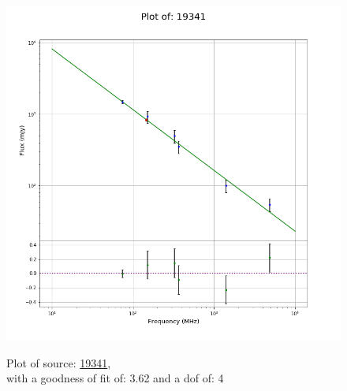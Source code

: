 \documentclass{article}
\begin{document}
\begin{figure}[H]
    \centering
    \begin{minipage}{.5\textwidth}
        \centering
        \includegraphics[scale = 0.35]{KmeulenTrap4P23_1min/1min19341.png}
        \captionsetup{labelformat=empty}
        \caption{Plot of source: \href{http://banana.transientskp.org/r4/vlo_KmeulenTrap4P23/runningcatalog/19341}{19341},\\with a goodness of fit of: 3.62 and a dof of: 4}
        \addtocounter{figure}{-1}
        \label{KmeulenTrap4P23:1min:19341:plot}
    \end{minipage}%
    \begin{minipage}{0.5\textwidth}
        \centering


\end{minipage}
\end{figure}
\end{document}

